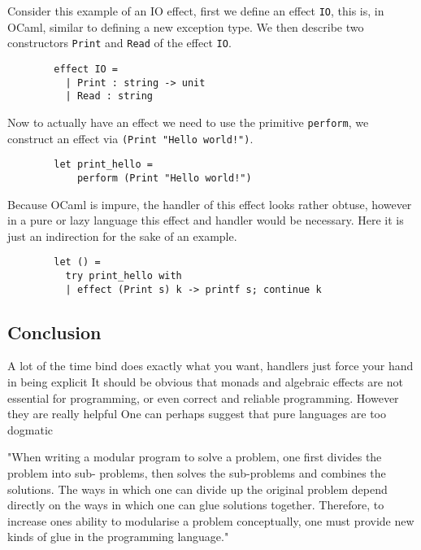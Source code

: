 \begin{example}
    Consider this example of an IO effect,
    first we define an effect \texttt{IO},
    this is, in OCaml, similar to defining
    a new exception type.
    We then describe two constructors
    \texttt{Print} and \texttt{Read}
    of the effect \texttt{IO}.
    \begin{verbatim}
        effect IO =
          | Print : string -> unit
          | Read : string\end{verbatim}
    Now to actually have an effect we need to use the primitive \texttt{perform},
    we construct an effect via \texttt{(Print "Hello world!")}.
    \begin{verbatim}
        let print_hello =
            perform (Print "Hello world!")\end{verbatim}
    Because OCaml is impure, the handler of this effect looks rather obtuse,
    however in a pure or lazy language this effect and handler would be necessary.
    Here it is just an indirection for the sake of an example.
    \begin{verbatim}
        let () =
          try print_hello with
          | effect (Print s) k -> printf s; continue k\end{verbatim}
\end{example}
\subsection{Conclusion}

A lot of the time bind does exactly what you want,
handlers just force your hand in being explicit
It should be obvious that monads and algebraic effects
are not essential for programming,
or even correct and reliable programming.
However they are really helpful
One can perhaps suggest that pure languages are too dogmatic

"When writing a modular program to solve a problem, one first divides the problem into sub- problems, then solves the sub-problems and combines the solutions. The ways in which one can divide up the original problem depend directly on the ways in which one can glue solutions together. Therefore, to increase ones ability to modularise a problem conceptually, one must provide new kinds of glue in the programming language."
\cite{hughes1989functional}
